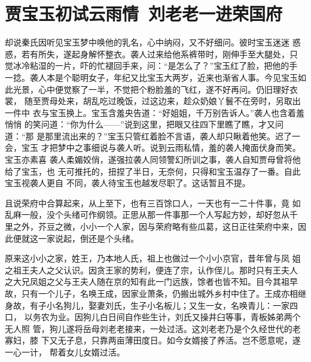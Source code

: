 \chapter{贾宝玉初试云雨情~刘老老一进荣国府}

却说秦氏因听见宝玉梦中唤他的乳名，心中纳闷，又不好细问。彼时宝玉迷迷
惑惑，若有所失，遂起身解怀整衣。袭人过来给他系裤带时，刚伸手至大腿处，只
觉冰冷粘湿的一片，吓的忙褪回手来，问：“是怎么了？”宝玉红了脸，把他的手
一捻。袭人本是个聪明女子，年纪又比宝玉大两岁，近来也渐省人事。今见宝玉如
此光景，心中便觉察了一半，不觉把个粉脸羞的飞红，遂不好再问。仍旧理好衣裳，
随至贾母处来，胡乱吃过晚饭，过这边来，趁众奶娘丫鬟不在旁时，另取出一件中
衣与宝玉换上。宝玉含羞央告道：“好姐姐，千万别告诉人。”袭人也含着羞悄悄
的笑问道：“你为什么——”说到这里，把眼又往四下里瞧了瞧，才又问道：“那
是那里流出来的？”宝玉只管红着脸不言语，袭人却只瞅着他笑。迟了一会，宝玉
才把梦中之事细说与袭人听。说到云雨私情，羞的袭人掩面伏身而笑。宝玉亦素喜
袭人柔媚姣俏，遂强拉袭人同领警幻所训之事，袭人自知贾母曾将他给了宝玉，也
无可推托的，扭捏了半日，无奈何，只得和宝玉温存了一番。自此宝玉视袭人更自
不同，袭人待宝玉也越发尽职了。这话暂且不提。

且说荣府中合算起来，从上至下，也有三百馀口人，一天也有一二十件事，竟
如乱麻一般，没个头绪可作纲领。正思从那一件事那一个人写起方妙，却好忽从千
里之外，芥豆之微，小小一个人家，因与荣府略有些瓜葛，这日正往荣府中来，因
此便就这一家说起，倒还是个头绪。

原来这小小之家，姓王，乃本地人氏，祖上也做过一个小小京官，昔年曾与凤
姐之祖王夫人之父认识。因贪王家的势利，便连了宗，认作侄儿。那时只有王夫人
之大兄凤姐之父与王夫人随在京的知有此一门远族，馀者也皆不知。目今其祖早
故，只有一个儿子，名唤王成，因家业萧条，仍搬出城外乡村中住了。王成亦相继
身故，有子小名狗儿，娶妻刘氏，生子小名板儿；又生一女，名唤青儿：一家四口，
以务农为业。因狗儿白日间自作些生计，刘氏又操井臼等事，青板姊弟两个无人照
管，狗儿遂将岳母刘老老接来，一处过活。这刘老老乃是个久经世代的老寡妇，膝
下又无子息，只靠两亩薄田度日。如今女婿接了养活。岂不愿意呢，遂一心一计，
帮着女儿女婿过活。

